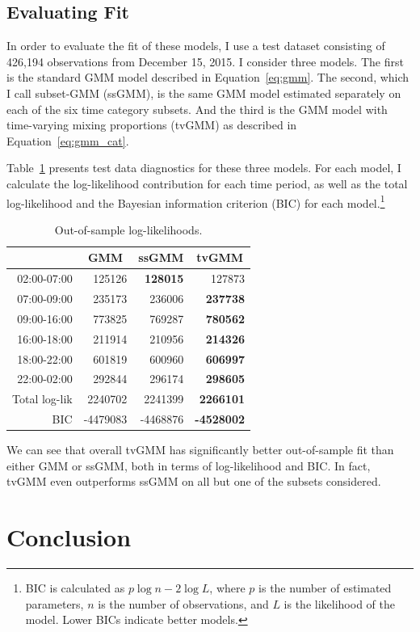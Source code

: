 \documentclass[12pt]{article}
\theoremstyle{definition}
\theoremstyle{algodesc}
\begin{document}
\subsection{Evaluating Fit}
In order to evaluate the fit of these models, I use a test dataset consisting of 426,194 observations from December 15, 2015. I consider three models. The first is the standard GMM model described in Equation~\ref{eq:gmm}. The second, which I call subset-GMM (ssGMM), is the same GMM model estimated separately on each of the six time category subsets. And the third is the GMM model with time-varying mixing proportions (tvGMM) as described in Equation~\ref{eq:gmm_cat}.

Table~\ref{tab:logliks} presents test data diagnostics for these three models. For each model, I calculate the log-likelihood contribution for each time period, as well as the total log-likelihood and the Bayesian information criterion (BIC) for each model.\footnote{BIC is calculated as $p \log n - 2 \log L$, where $p$ is the number of estimated parameters, $n$ is the number of observations, and $L$ is the likelihood of the model. Lower BICs indicate better models.}

\begin{table}[htb] \centering
\begin{tabular}{rrrr}
  \toprule
   & \multicolumn{1}{c}{GMM} & \multicolumn{1}{c}{ssGMM} & \multicolumn{1}{c}{tvGMM} \\
  \midrule
  02:00-07:00 &  125126 &  \textbf{128015} &  127873 \\
  07:00-09:00 &  235173 &  236006 &  \textbf{237738} \\
  09:00-16:00 &  773825 &  769287 &  \textbf{780562} \\
  16:00-18:00 &  211914 &  210956 &  \textbf{214326} \\
  18:00-22:00 &  601819 &  600960 &  \textbf{606997} \\
  22:00-02:00 &  292844 &  296174 &  \textbf{298605} \\
  \midrule
  Total log-lik &  2240702 &  2241399 &  \textbf{2266101} \\
  BIC           & -4479083 & -4468876 & \textbf{-4528002} \\
  \bottomrule
\end{tabular}
\caption{Out-of-sample log-likelihoods.}
\label{tab:logliks}
\end{table}

We can see that overall tvGMM has significantly better out-of-sample fit than either GMM or ssGMM, both in terms of log-likelihood and BIC. In fact, tvGMM even outperforms ssGMM on all but one of the subsets considered.





\section{Conclusion}




\end{document}
